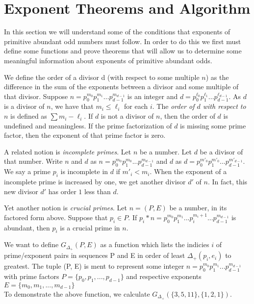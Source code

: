 \documentclass[../paper.tex]{subfiles}
\begin{document}
\section{Exponent Theorems and Algorithm}

In this section we will understand some of the conditions that
exponents of primitive abundant odd numbers must follow. In order
to do this we first must define some functions and prove theorems 
that will allow us to determine some meaningful information about
exponents of primitive abundant odds.

We define the order of a divisor d (with respect to some multiple
$n$) as the difference in the sum of the exponents between a
divisor and some multiple of that divisor. Suppose $n = p_0^{m_0}
p_1^{m_1} ... p_{d-1}^{m_{d-1}}$ is an integer and $d = p_0^{\ell_0}
p_1^{\ell_1} ... p_{d-1}^{\ell_{d-1}}$. As $d$ is a divisor of
$n$, we have that $m_i \leq \ell_i$ for each $i$. The
\textit{order of $d$ with respect to $n$} is defined as $\sum {m_i
- \ell_i}$. If $d$ is not a divisor of $n$, then the order of $d$
is undefined and meaningless. If the prime factorization of $d$ is
missing some prime factor, then the exponent of that prime factor
is zero.

A related notion is \textit{incomplete primes}. Let $n$ be a
number. Let $d$ be a divisor of that number.
Write $n$ and $d$ as $n = p_0^{m_0} p_1^{m_0}...
p_{d-1}^{m_{d-1}}$ and $d$ as $d = p_0^{m'_0} p_1^{m'_0} ...
p_{d-1}^{m'_{d-1}}$. We say a prime $p_i$ is incomplete in
$d$ if $m'_i < m_i$. When the exponent of a incomplete prime is
increased by one, we get another divisor $d'$ of $n$. In fact, 
this new divisor $d'$ has order $1$ less than $d$.

Yet another notion is \textit{crucial primes}. Let $n = (P,E)$ 
be a number, in its factored form above. Suppose that $p_i \in P$.
If $p_i * n = p_0^{m_0} p_1^{m_1} ... p_{i}^{m_i + 1} ...
p_{d-1}^{m_{d-1}}$ is abundant, then $p_i$ is a crucial prime in
$n$.

We want to define $G_{\Delta_{+}}(P,E)$ as a function which lists
the indicies $i$ of prime/exponent pairs in sequences P and E
in order of least $\Delta_{+}(p_i, e_i)$ to greatest. The tuple
(P, E) is ment to represent some integer $n = p_0^{m_0} p_1^{m_1}
... p_{d-1}^{m_{d-1}}$ with prime factors $P = \{p_0, p_1, ..., 
p_{d-1}\}$ and respective exponents $E = \{m_0, m_1, ...,
m_{d-1}\}$ 
\\

To demonstrate the above function, we calculate 
$G_{\Delta_{+}}(\{3,5,11\}, \{1,2,1\})$.
\end{document}
